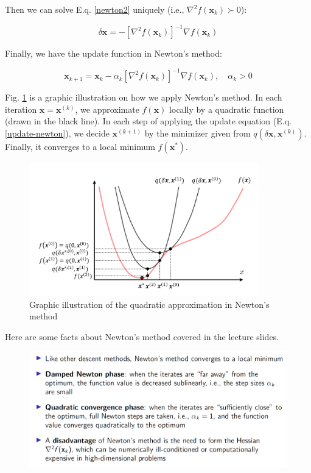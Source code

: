 Then we can solve E.q. \ref{newton2} uniquely  (i.e., 
$\nabla^2 f(\textbf{x}_k)\succ 0$):

\begin{equation}
    \delta \mathbf{x}=-\left[\nabla^2 f\left(\mathbf{x}_k\right)\right]^{-1} \nabla f\left(\mathbf{x}_k\right)
\end{equation}

Finally, we have the update function in Newton's method:

\begin{equation}
    \mathbf{x}_{k+1}=\mathbf{x}_k-\alpha_k\left[\nabla^2 f\left(\mathbf{x}_k\right)\right]^{-1} \nabla f\left(\mathbf{x}_k\right), \quad \alpha_k>0
    \label{update-newton}
\end{equation}

Fig. \ref{fig:y_2_3_1} is a graphic illustration on how we apply Newton's method. In each iteration 
$\mathbf{x} = \mathbf{x}^{(k)}$, we approximate $f(\mathbf{x})$ locally by a quadratic function
(drawn in the black line). In each step of applying the update equation (E.q. \ref{update-newton}),
we decide $\mathbf{x}^{(k+1)}$ by the minimizer given from $q(\delta \mathbf{x}, \mathbf{x}^{(k)})$.
Finally, it converges to a local minimum $f(\mathbf{x}^*)$.

\begin{figure}[!htb]
    \centering
    \includegraphics[width=10cm]{./img/img-2-3/y_2_3_1.png}
    \caption{Graphic illustration of the quadratic approximation in Newton's method}
    \label{fig:y_2_3_1}
\end{figure}

Here are some facts about Newton's method covered in the lecture slides.

\begin{figure}[!htb]
    \centering
    \includegraphics[width=12cm]{./img/img-2-3/y_2_3_2.png}
    \label{fig:y_2_3_2}
\end{figure}

